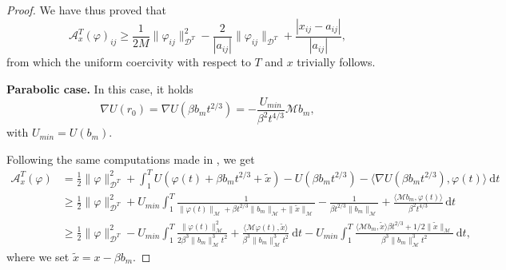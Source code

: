 \documentclass[a4paper,10pt]{amsart}
\newcommand{\ud}{\mathrm{d}}
\theoremstyle{plain}
\theoremstyle{definition}
\numberwithin{equation}{section}
\numberwithin{thm}{section}
\begin{document}
\begin{proof}
    We have thus proved that
\[
\mathcal{A}_{x}^T(\varphi)_{ij} \ge \frac{1}{2M}\|\varphi_{ij}\|_{\mathcal{D}^T}^2-\frac{2}{|a_{ij}|}\|\varphi_{ij}\|_{\mathcal{D}^T}+\frac{|x_{ij} - a_{ij}|}{|a_{ij}|},
\]
from which the uniform coercivity with respect to $T$ and $x$ trivially follows.

\smallskip
{\bf Parabolic case.} In this case, it holds
\[
\nabla U(r_0) = \nabla U(\beta b_m t^{2/3})= -\frac{U_{min}}{\beta^2t^{4/3}}\mathcal{M}b_m,
 \]
 with $U_{min}=U(b_m)$.
 
Following the same computations made in \cite[Section 4.1]{PolimeniTerracini}, we get
\[
\begin{split}
\mathcal{A}_{x}^T(\varphi) &= \frac{1}{2}\|\varphi\|^2_{\mathcal{D}^T}+ \int_{1}^{T} U(\varphi(t) + \beta b_m t^{2/3} + \tilde x) - U(\beta b_m t^{2/3}) - \langle \nabla U(\beta b_m t^{2/3}),\varphi(t)\rangle\ \ud t
    \\
    &\ge \frac{1}{2}\|\varphi\|^2_{\mathcal{D}^T}+ U_{min}\int_1^T  \frac{1}{\|\varphi(t)\|_{\mathcal{M}}+\beta t^{2/3}\|b_m\|_\mathcal{M}+\|\tilde x\|_\mathcal{M}}-\frac{1}{\beta t^{2/3}\|b_m\|_\mathcal{M}}+\frac{\langle \mathcal{M}b_m,\varphi(t)\rangle}{\beta^2 t^{4/3}}\,\ud t
    \\
    & \ge \frac{1}{2}\|\varphi\|^2_{\mathcal{D}^T}-U_{min}\int_1^T\frac{\|\varphi(t)\|_\mathcal{M}^2}{2\beta^3\|b_m\|_\mathcal{M}^3t^2}+\frac{\langle \mathcal{M}\varphi(t),\tilde x\rangle}{\beta^3\|b_m\|_\mathcal{M}^3t^2}\ \ud t -U_{min}\int_1^T \frac{\langle\mathcal{M} b_m,\tilde x\rangle \beta t^{2/3}+1/2\|\tilde x\|_\mathcal{M}}{\beta^3\|b_m\|_\mathcal{M}^3t^2}\ \ud t,
    \end{split}
\]
where we set $\tilde x=x-\beta b_m$. 


\end{proof}
\end{document}
